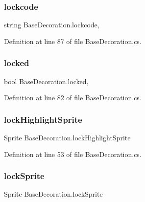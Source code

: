 \subsubsection{\texorpdfstring{lockcode}{lockcode}}
{\footnotesize\ttfamily string Base\+Decoration.\+lockcode\hspace{0.3cm}{\ttfamily [get]}, {\ttfamily [set]}}



Definition at line 87 of file Base\+Decoration.\+cs.

\mbox{\label{class_base_decoration_af2de5b4108e95dde06664e23e7a4560e}} 
\subsubsection{\texorpdfstring{locked}{locked}}
{\footnotesize\ttfamily bool Base\+Decoration.\+locked\hspace{0.3cm}{\ttfamily [get]}, {\ttfamily [set]}}



Definition at line 82 of file Base\+Decoration.\+cs.

\mbox{\label{class_base_decoration_a119c7bf4539a0ace2f1692c85896adf6}} 
\subsubsection{\texorpdfstring{lockHighlightSprite}{lockHighlightSprite}}
{\footnotesize\ttfamily Sprite Base\+Decoration.\+lock\+Highlight\+Sprite\hspace{0.3cm}{\ttfamily [get]}}



Definition at line 53 of file Base\+Decoration.\+cs.

\mbox{\label{class_base_decoration_a4d92d8545d17f46daa590aa37e04531f}} 
\subsubsection{\texorpdfstring{lockSprite}{lockSprite}}
{\footnotesize\ttfamily Sprite Base\+Decoration.\+lock\+Sprite\hspace{0.3cm}{\ttfamily [get]}}



